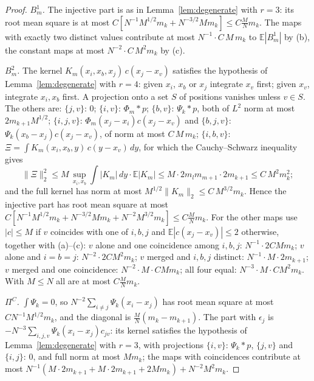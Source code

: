 \begin{proof}
\emph{$B^1_m$.} The injective part is as in Lemma~\ref{lem:degenerate} with $r=3$:
its root mean square is at most $C[N^{-1}M^{1/2}m_k+N^{-3/2}Mm_k]\le C\frac MNm_k$. The maps with exactly
two distinct values contribute at most $N^{-1}\cdot C\,M\,m_k$ to $\mathbb E|B^1_m|$ by (b), the constant
maps at most $N^{-2}\cdot C\,M^2m_k$ by (c).

\emph{$B^2_m$.} The kernel $K_m(x_i,x_b,x_j)\,c(x_j-x_v)$ satisfies the hypothesis of
Lemma~\ref{lem:degenerate} with $r=4$: given $x_i$, $x_b$ or $x_j$ integrate $x_v$ first; given $x_v$,
integrate $x_i,x_b$ first. A projection onto a set $S$ of positions vanishes unless $v\in S$. The others
are: $\{j,v\}$: $0$; $\{i,v\}$: $\Phi_m*p$; $\{b,v\}$: $\Psi_k*p$, both of $L^2$ norm at most
$2m_{k+1}M^{1/2}$; $\{i,j,v\}$: $\Phi_m(x_j-x_i)c(x_j-x_v)$ and $\{b,j,v\}$: $\Psi_k(x_b-x_j)c(x_j-x_v)$,
of norm at most $C\,M\,m_k$; $\{i,b,v\}$: $\Xi=\int K_m(x_i,x_b,y)\,c(y-x_v)\,dy$, for which the
Cauchy--Schwarz inequality gives
\[
 \|\Xi\|_2^2\le M\,\sup_{x_i,x_b}\int|K_m|\,dy\cdot\mathbb E|K_m|\le M\cdot2m_lm_{m+1}\cdot2m_{k+1}\le C\,M^2m_k^2;
\]
and the full kernel has norm at most $M^{1/2}\|K_m\|_2\le C\,M^{3/2}m_k$. Hence the injective part has root
mean square at most $C[N^{-1}M^{1/2}m_k+N^{-3/2}Mm_k+N^{-2}M^{3/2}m_k]\le C\frac MNm_k$. For the other maps
use $|c|\le M$ if $v$ coincides with one of $i,b,j$ and $\mathbb E|c(x_j-x_v)|\le2$ otherwise, together
with (a)--(c): $v$ alone and one coincidence among $i,b,j$: $N^{-1}\cdot2CMm_k$; $v$ alone and $i=b=j$:
$N^{-2}\cdot2CM^2m_k$; $v$ merged and $i,b,j$ distinct: $N^{-1}\cdot M\cdot2m_{k+1}$; $v$ merged and one
coincidence: $N^{-2}\cdot M\cdot CMm_k$; all four equal: $N^{-3}\cdot M\cdot CM^2m_k$. With $M\le N$ all are
at most $C\frac MNm_k$.

\emph{$\Pi^C$.} $\int\Psi_k=0$, so $N^{-2}\sum_{i\ne j}\Psi_k(x_i-x_j)$ has root mean square at most
$CN^{-1}M^{1/2}m_k$, and the diagonal is $\frac MN(m_k-m_{k+1})$. The part with $\epsilon_j$ is
$-N^{-3}\sum_{i,j,v}\Psi_k(x_i-x_j)c_{jv}$: its kernel satisfies the hypothesis of
Lemma~\ref{lem:degenerate} with $r=3$, with projections $\{i,v\}$: $\Psi_k*p$, $\{j,v\}$ and $\{i,j\}$: $0$,
and full norm at most $Mm_k$; the maps with coincidences contribute at most
$N^{-1}(M\cdot2m_{k+1}+M\cdot2m_{k+1}+2Mm_k)+N^{-2}M^2m_k$.


\end{proof}
